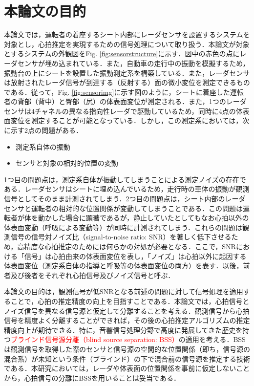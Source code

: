 \section{本論文の目的}
本論文では，運転者の着座するシート内部にレーダセンサを設置するシステムを対象とし，心拍推定を実現するための信号処理について取り扱う．本論文が対象とするシステムの外観図をFig. \ref{fig:sensorstructure}に示す．図中の赤色の点にレーダセンサが埋め込まれている．また，自動車の走行中の振動を模擬するため，振動台の上にシートを設置した振動測定系を構築している．また，レーダセンサは放射されたレーダ信号が到達する（反射する）面の微小変位を測定できるものである．従って，Fig. \ref{fig:sensorimg}に示す図のように，シートに着座した運転者の背部（背中）と臀部（尻）の体表面変位が測定される．また，1つのレーダセンサは4チャネルの異なる指向性レーダで駆動しているため，同時に4点の体表面変位を測定することが可能となっている．しかし，この測定系においては，次に示す2点の問題がある．
\begin{itemize}
	\item 測定系自体の振動
	\item センサと対象の相対的位置の変動
\end{itemize}
1つ目の問題点は，測定系自体が振動してしまうことによる測定ノイズの存在である．レーダセンサはシートに埋め込んでいるため，走行時の車体の振動が観測信号としてそのまま計測されてしまう．2つ目の問題点は，シート内部のレーダセンサと運転者の相対的な位置関係が変動してしまうことである．この問題は運転者が体を動かした場合に顕著であるが，静止していたとしてもなお心拍以外の体表面変動（呼吸による変動等）が同時に計測されてしまう．これらの問題は観測信号の信号対ノイズ比（signal-to-noise ratio: SNR）を著しく低下させるため，高精度な心拍推定のためには何らかの対処が必要となる．ここで，SNRにおける「信号」は心拍由来の体表面変位を表し，「ノイズ」は心拍以外に起因する体表面変位（測定系自体の指導と呼吸等の体表面変位の両方）を表す．以後，前者及び後者をそれぞれ心拍信号及びノイズ信号と呼ぶ．

本論文の目的は，観測信号が低SNRとなる前述の問題に対して信号処理を適用することで，心拍の推定精度の向上を目指すことである．本論文では，心拍信号とノイズ信号を異なる信号源と仮定して分離することを考える．観測信号から心拍信号を精度よく分離することができれば，その後の心拍推定アルゴリズムの推定精度向上が期待できる．特に，音響信号処理分野で高度に発展してきた歴史を持つ\textcolor{red}{ブラインド信号源分離（blind source separation: BSS）}\cite{originica, ica2}の適用を考える．BSSは観測信号を取得した際のセンサと信号源の空間的な位置関係（即ち，信号源の混合系）が未知という条件（ブラインド）の下で混合前の信号源を推定する技術である．本研究においては，レーダや体表面の位置関係を事前に仮定しないことから，心拍信号の分離にBSSを用いることは妥当である．

